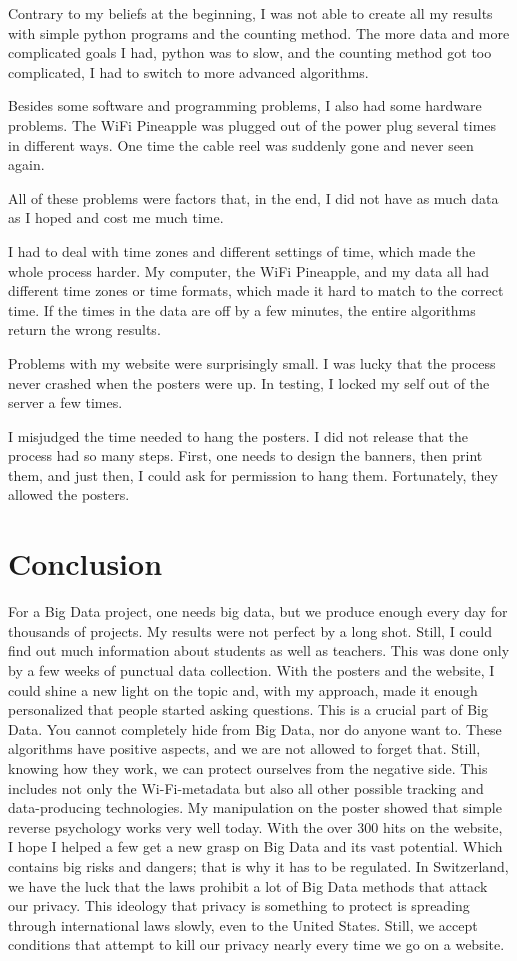 \documentclass[paper=a4, fontsize=11pt]{article}
\begin{document}
Contrary to my beliefs at the beginning, I was not able to create all my results with simple python programs and the counting method. The more data and more complicated goals I had, python was to slow, and the counting method got too complicated, I had to switch to more advanced algorithms.

Besides some software and programming problems, I also had some hardware problems. The WiFi Pineapple was plugged out of the power plug several times in different ways. One time the cable reel was suddenly gone and never seen again.

All of these problems were factors that, in the end, I did not have as much data as I hoped and cost me much time.

I had to deal with time zones and different settings of time, which made the whole process harder. My computer, the WiFi Pineapple, and my data all had different time zones or time formats, which made it hard to match to the correct time. If the times in the data are off by a few minutes, the entire algorithms return the wrong results.

Problems with my website were surprisingly small. I was lucky that the process never crashed when the posters were up. In testing, I locked my self out of the server a few times.

I misjudged the time needed to hang the posters. I did not release that the process had so many steps. First, one needs to design the banners, then print them, and just then, I could ask for permission to hang them. Fortunately, they allowed the posters.


\section{Conclusion}
For a Big Data project, one needs big data, but we produce enough every day for thousands of projects. My results were not perfect by a long shot. Still, I could find out much information about students as well as teachers. This was done only by a few weeks of punctual data collection. With the posters and the website, I could shine a new light on the topic and, with my approach, made it enough personalized that people started asking questions. This is a crucial part of Big Data. You cannot completely hide from Big Data, nor do anyone want to. These algorithms have positive aspects, and we are not allowed to forget that. Still, knowing how they work, we can protect ourselves from the negative side. This includes not only the Wi-Fi-metadata but also all other possible tracking and data-producing technologies. My manipulation on the poster showed that simple reverse psychology works very well today. With the over 300 hits on the website, I hope I helped a few get a new grasp on Big Data and its vast potential. Which contains big risks and dangers; that is why it has to be regulated.
In Switzerland, we have the luck that the laws prohibit a lot of Big Data methods that attack our privacy. This ideology that privacy is something to protect is spreading through international laws slowly, even to the United States. Still, we accept conditions that attempt to kill our privacy nearly every time we go on a website.
\end{document}

